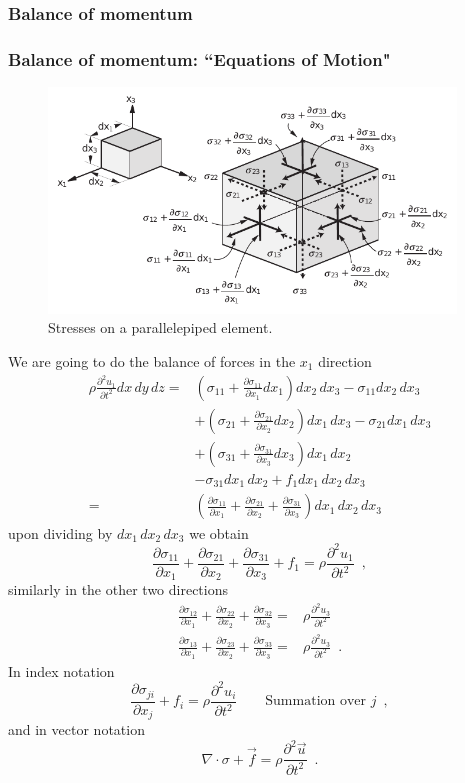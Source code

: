 \documentclass{beamer}
\newcommand{\pardiff}[2]{\frac{\partial #1}{\partial #2}}
\newcommand{\pardiffd}[2]{\frac{\partial^2 #1}{\partial #2^2}}
\begin{document}
\subsubsection{Balance of momentum}
\begin{frame}[allowframebreaks]\frametitle{Balance of momentum: ``Equations of Motion"}
\begin{figure}[h]
	\centering
	\includegraphics[height=6cm]{img/momentum.pdf}
	\caption{Stresses on a parallelepiped element.}
\end{figure}
We are going to do the balance of forces in the $x_1$ direction
\begin{align*}
\rho \pardiffd{u_1}{t} dx\, dy\, dz =& \left(\sigma_{11} + \pardiff{\sigma_{11}}{x_1}dx_1\right)dx_2\, dx_3 - \sigma_{11} dx_2\, dx_3\\
&+ \left(\sigma_{21} + \pardiff{\sigma_{21}}{x_2}dx_2\right)dx_1\, dx_3
 -\sigma_{21}dx_1\, dx_3\\
&+ \left(\sigma_{31} + \pardiff{\sigma_{31}}{x_3}dx_3\right)dx_1\, dx_2\\
&- \sigma_{31}dx_1\, dx_2 + f_1 dx_1\, dx_2\, dx_3 \\
=& \left(\pardiff{\sigma_{11}}{x_1} + \pardiff{\sigma_{21}}{x_2} + \pardiff{\sigma_{31}}{x_3}\right)dx_1\, dx_2\, dx_3
\end{align*}
upon dividing by $dx_1\, dx_2\, dx_3$ we obtain
\[\pardiff{\sigma_{11}}{x_1} + \pardiff{\sigma_{21}}{x_2} + \pardiff{\sigma_{31}}{x_3} + f_1= \rho \pardiffd{u_1}{t} \enspace ,\]
similarly in the other two directions
\begin{align*}
\pardiff{\sigma_{12}}{x_1} + \pardiff{\sigma_{22}}{x_2} + \pardiff{\sigma_{32}}{x_3} =& \rho \pardiffd{u_3}{t} \\
\pardiff{\sigma_{13}}{x_1} + \pardiff{\sigma_{23}}{x_2} + \pardiff{\sigma_{33}}{x_3} =& \rho \pardiffd{u_3}{t} \enspace .
\end{align*}
In index notation
\[\pardiff{\sigma_{ji}}{x_j} + f_i = \rho\pardiffd{u_i}{t}\qquad \text{Summation over } j \enspace ,\]
and in vector notation
\[\nabla\cdot \sigma + \vec{f} = \rho \pardiffd{\vec{u}}{t} \enspace .\]
\end{frame}
\end{document}
